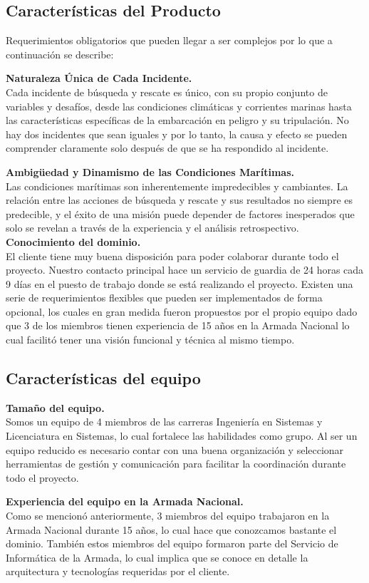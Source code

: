 \subsection{Características del Producto} 

Requerimientos obligatorios que pueden llegar a ser complejos por lo que a continuación se describe:

\textbf{Naturaleza Única de Cada Incidente.}\\
Cada incidente de búsqueda y rescate es único, con su propio conjunto de variables y desafíos, desde las condiciones 
climáticas y corrientes marinas hasta las características específicas de la embarcación en peligro y su tripulación. 
No hay dos incidentes que sean iguales y por lo tanto, la causa y efecto se pueden comprender claramente solo después de que 
se ha respondido al incidente.

\textbf{Ambigüedad y Dinamismo de las Condiciones Marítimas.}\\
Las condiciones marítimas son inherentemente impredecibles y cambiantes. La relación entre las acciones de búsqueda y rescate 
y sus resultados no siempre es predecible, y el éxito de una misión puede depender de factores inesperados que solo se revelan 
a través de la experiencia y el análisis retrospectivo.\\

\textbf{Conocimiento del dominio.}\\
El cliente tiene muy buena disposición para poder colaborar durante todo el proyecto. Nuestro contacto principal hace un 
servicio de guardia de 24 horas cada 9 días en el puesto de trabajo donde se está realizando el proyecto.
Existen una serie de requerimientos flexibles que pueden ser implementados de forma opcional, los cuales en gran medida fueron 
propuestos por el propio equipo dado que 3 de los miembros tienen experiencia de 15 años en la Armada Nacional lo cual 
facilitó tener una visión funcional y técnica al mismo tiempo.


\subsection{Características del equipo} 
\textbf{Tamaño del equipo.}\\
Somos un equipo de 4 miembros de las carreras Ingeniería en Sistemas y Licenciatura en Sistemas, lo cual fortalece las 
habilidades como  grupo. Al ser un equipo reducido es necesario contar con una buena organización y seleccionar herramientas 
de gestión y comunicación para facilitar la coordinación durante todo el proyecto.

\textbf{Experiencia del equipo en la Armada Nacional.}\\
Como se mencionó anteriormente, 3 miembros del equipo trabajaron en la Armada Nacional durante 15 años, lo cual hace que 
conozcamos bastante el dominio. También estos miembros del equipo formaron parte del Servicio de Informática de la Armada, 
lo cual implica que se conoce en detalle la arquitectura y tecnologías requeridas por el cliente.
